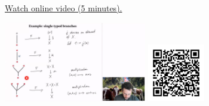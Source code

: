 
\begin{minipage}{10cm}
    \href{https://act4e-spring21.netlify.app/videos/spring2021-operads-b:single-typed-branches.html}{Watch online video (5 minutes).}
        
    \href{https://act4e-spring21.netlify.app/videos/spring2021-operads-b:single-typed-branches.html}{\includegraphics[height=3.5cm]{spring2021-operads-b:single-typed-branches/thumbnails.jpg}}
    \href{https://act4e-spring21.netlify.app/videos/spring2021-operads-b:single-typed-branches.html}{\includegraphics[height=2.5cm]{spring2021-operads-b:single-typed-branches/qrcode.png}}
\end{minipage}
